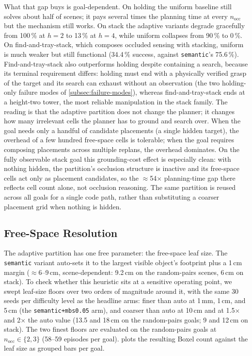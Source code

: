 What that gap buys is goal-dependent. On holding the uniform baseline
still solves about half of scenes; it pays several times the planning
time at every $n_\text{occ}$ but the mechanism still works. On stack the
adaptive variants degrade gracefully from 100\,\% at $h=2$ to 13\,\% at
$h=4$, while uniform collapses from 90\,\% to 0\,\%. On
find-and-tray-stack, which composes occluded sensing with stacking,
uniform is much weaker but still functional (34.4\,\% success, against \texttt{semantic}'s 75.6\,\%). Find-and-tray-stack also outperforms holding despite containing a search, because its terminal requirement differs: holding must end with a physically verified grasp of the target and its search can exhaust without an observation (the two holding-only failure modes of \cref{subsec:failure-modes}), whereas find-and-tray-stack ends at a height-two tower, the most reliable manipulation in the stack family. The reading is that the
adaptive partition does not change the planner; it changes how many
irrelevant cells the planner has to ground and search over. When the goal
needs only a handful of candidate placements (a single hidden target),
the overhead of a few hundred free-space cells is tolerable; when the
goal requires composing placements across multiple replans, the overhead
dominates. On the fully observable stack goal this grounding-cost effect is
especially clean: with nothing hidden, the partition's occlusion structure is
inactive and its free-space cells act only as placement candidates, so the
$\approx$54$\times$ planning-time gap there reflects cell count alone, not
occlusion reasoning. The same partition is reused across all goals for a single
code path, rather than substituting a coarser placement grid when nothing is
hidden.

\subsection{Free-Space Resolution}
\label{subsec:resolution}

The adaptive partition has one free parameter: the free-space leaf size. The \texttt{semantic} variant auto-sets it to the largest visible object's footprint plus a 1\,cm margin ($\approx$6--9\,cm, scene-dependent: 9.2\,cm on the random-pairs scenes, 6\,cm on stack). To check whether this heuristic sits at a sensitive operating point, we swept leaf-size floors over two orders of magnitude around it, with the same 30 seeds per difficulty level as the headline arms: finer than auto at 1\,mm, 1\,cm, and 5\,cm (the \texttt{semantic+mbs0.05} arm), and coarser than auto at 10\,cm and at 1.5$\times$ and 2$\times$ the auto value (13.5 and 18\,cm on the random-pairs goals; 9 and 12\,cm on stack). The two finest floors are evaluated on the random-pairs goals at $n_\text{occ}\in\{2,3\}$ (58--59 episodes per goal).  plots the resulting Boxel count against the leaf size as grouped bars per goal.

